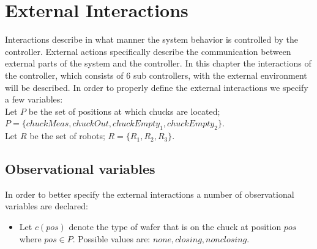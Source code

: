 \section{External Interactions}
Interactions describe in what manner the system behavior is controlled by the controller.
External actions specifically describe the communication between external parts of the system and the controller.
In this chapter the interactions of the controller, which consists of $6$ sub controllers, with the external environment will be described.
In order to properly define the external interactions we specify a few variables:
\\Let $P$ be the set of positions at which chucks are located; $P = \{chuckMeas, chuckOut, chuckEmpty_1, chuckEmpty_2\}$.
\\Let $R$ be the set of robots; $R = \{R_1,R_2,R_3\}$.

\subsection{Observational variables}
In order to better specify the external interactions a number of observational variables are declared:
\begin{itemize}
\item Let $c(pos)$ denote the type of wafer that is on the chuck at position $pos$ where $pos \in P$. Possible values are: $none, closing, nonclosing$.
\end{itemize}
